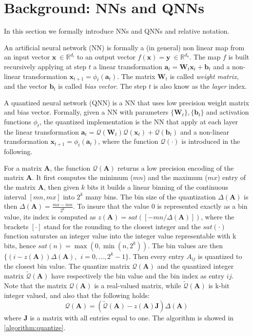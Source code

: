 \section{Background: NNs and QNNs}\label{sec:background}

In this section we formally introduce NNs and QNNs and relative notation.

An artificial neural network (NN) is formally a (in general) non linear map from an input vector $\mathbf{x} \ \in \mathbb{R}^{d_i}$ to an output vector $f(\mathbf{x} ) = \mathbf{y} \ \in \mathbb{R}^{d_o}$. The map $f$ is built recursively applying at step $t$ a linear transformation $ \mathbf{a}_t = \mathbf{W}_t\mathbf{x}_t + \mathbf{b}_t$ and a non-linear transformation $\mathbf{x}_{t+1} = \phi_t(\mathbf{a}_t)$. The matrix $\mathbf{W}_t$ is called \emph{weight matrix}, and the vector $\mathbf{b}_t$ is called \emph{bias vector}. The step $t$ is also know as the \emph{layer} index. 

A quantized neural network (QNN) is a NN that uses low precision weight matrix and bias vector. Formally, given a NN with parameters $\{\mathbf{W}_t\}, \{\mathbf{b}_t\}$ and activation functions $\phi_t$, the quantized implementation is the NN that apply at each layer the linear transformation $\mathbf{a}_t = \mathcal{Q}(\mathbf{W}_t) \mathcal{Q}(\mathbf{x}_t) + \mathcal{Q}(\mathbf{b}_t)$ and a non-linear transformation $\mathbf{x}_{t+1} = \phi_t(\mathbf{a}_t)$, where the function $\mathcal{Q}(\cdot)$ is introduced in the following.

 For a matrix $\mathbf{A}$, the function $\mathcal{Q}(\mathbf{A})$ returns a low precision encoding of the matrix $\mathbf{A}$. It first computes the minimum ($mn$) and the maximum ($mx$) entry of the matrix $\mathbf{A}$, then given $k$ bits it builds a linear binning of the continuous interval $[mn,mx]$ into $2^k$ many bins. The bin size of the quantization $\Delta(\mathbf{A})$ is then $\Delta(\mathbf{A}) = \frac{mx - mn}{2^k}$. To insure that the value $0$ is represented exactly as a bin value, its index is computed as $z(\mathbf{A}) = sat([-mn/\Delta(\mathbf{A})])$, where the brackets $[\cdot]$ stand for the rounding to the closest integer and the $sat(\cdot)$ function saturates an integer value into the integer value representable with k bits, hence $sat(n) = \max(0, \min(n,2^k) )$. The bin values are then $\{ (i-z(\mathbf{A})) \Delta(\mathbf{A}), \ \ i = 0, \dots, 2^k -1 \}$. Then every entry $A_{ij}$ is quantized to the closest bin value. The quantize matrix  $\mathcal{Q}(\mathbf{A})$ and the quantized integer matrix $\tilde{\mathcal{Q}}(\mathbf{A})$ have respectively the bin value and the bin index as entry $ij$. Note that the matrix $\mathcal{Q}(\mathbf{A})$ is a real-valued matrix, while $\tilde{\mathcal{Q}}(\mathbf{A})$ is k-bit integer valued, and also that the following holds:
\begin{equation}\label{equation:affine_transf}
\mathcal{Q}(\mathbf{A}) = (\tilde{\mathcal{Q}}(\mathbf{A}) -z(\mathbf{A}) \mathbf{J}  ) \Delta(\mathbf{A})
\end{equation} 
where $\mathbf{J}$ is a matrix with all entries equal to one. The algorithm is showed in \cref{algorithm:quantize}.

